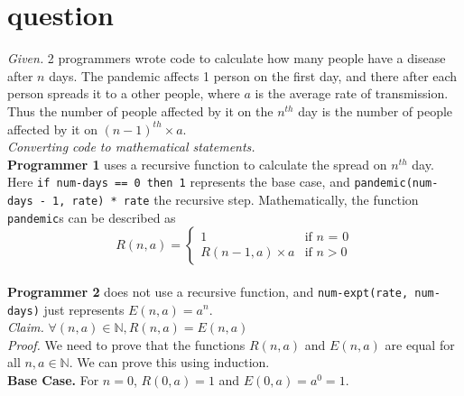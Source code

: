\documentclass[11pt]{article}
\begin{document}
\section{question}
\emph{Given. } 2 programmers wrote code to calculate how many people have a disease after $n$ days. The pandemic affects 1 person on the first day, and there after
each person spreads it to a other people, where $a$ is the average rate of
transmission. Thus the number of people affected by it on the $n^{th}$ day
is the number of people affected by it on $(n - 1)^{th} \times a$.  \medskip \\
\noindent \emph{Converting code to mathematical statements. } \\
\textbf{Programmer 1} uses a recursive function to calculate the spread on $n^{th}$ day. Here \texttt{if num-days == 0 then 1} represents the base case, and \texttt{pandemic(num-days - 1, rate) * rate} the recursive step. Mathematically, the function \texttt{pandemic}s  can be described as $$
R(n, a) =\begin{cases}
                1 & \text{if $n$ = 0} \\
                R(n-1, a) \times a & \text{if } n > 0
		 \end{cases}
$$
\\
\noindent \textbf{Programmer 2} does not use a recursive function, and \texttt{num-expt(rate, num-days)} just represents $E(n, a) = a^n$. 
\medskip \\
\emph{Claim. } $\forall (n, a) \in \mathbb{N}, R(n, a) = E(n, a)$ \medskip \\
\emph{Proof. } We need to prove that the functions $R(n, a)$ and $E(n, a)$ are equal for all $n, a \in \mathbb{N}$. We can prove this using induction. \\
\textbf{Base Case. } For $n = 0$, $R(0, a) = 1$ and $E(0, a) = a^0 = 1$. \\
\end{document}
